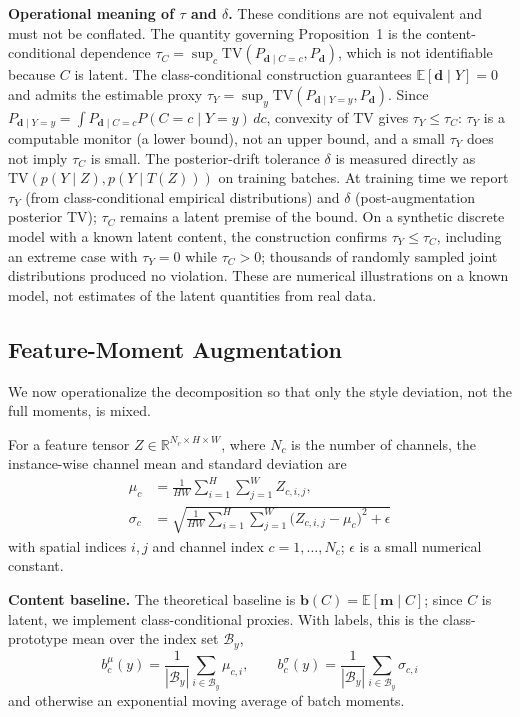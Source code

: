 \documentclass[electronics,article,submit,moreauthors]{Definitions/mdpi}
\newcommand{\add}[1]{\textcolor{addblue}{#1}}
\newcommand{\del}[1]{\textcolor{delred}{\st{#1}}}
\def\add#1{#1}%
\def\del#1{}%
\renewcommand{\add}[1]{#1}
\renewcommand{\del}[1]{}
\begin{document}
\add{\noindent\textbf{Operational meaning of $\tau$ and $\delta$.} These conditions are not equivalent and must not be conflated. The quantity governing Proposition~1 is the content-conditional dependence $\tau_C=\sup_c\mathrm{TV}(P_{\mathbf d\mid C=c},P_{\mathbf d})$, which is not identifiable because $C$ is latent. The class-conditional construction guarantees $\mathbb E[\mathbf d\mid Y]=0$ and admits the estimable proxy $\tau_Y=\sup_y\mathrm{TV}(P_{\mathbf d\mid Y=y},P_{\mathbf d})$. Since $P_{\mathbf d\mid Y=y}=\int P_{\mathbf d\mid C=c}P(C=c\mid Y=y)\,dc$, convexity of TV gives $\tau_Y\le\tau_C$: $\tau_Y$ is a computable monitor (a lower bound), not an upper bound, and a small $\tau_Y$ does not imply $\tau_C$ is small. The posterior-drift tolerance $\delta$ is measured directly as $\mathrm{TV}(p(Y\mid Z),p(Y\mid T(Z)))$ on training batches. At training time we report $\tau_Y$ (from class-conditional empirical distributions) and $\delta$ (post-augmentation posterior TV); $\tau_C$ remains a latent premise of the bound. On a synthetic discrete model with a known latent content, the construction confirms $\tau_Y\le\tau_C$, including an extreme case with $\tau_Y=0$ while $\tau_C>0$; thousands of randomly sampled joint distributions produced no violation. These are numerical illustrations on a known model, not estimates of the latent quantities from real data.}

\subsection{Feature-Moment Augmentation}
\label{sec:momentaug}

We now operationalize the decomposition so that only the style deviation, not the full moments, is mixed.

For a feature tensor $Z\in\mathbb{R}^{N_c\times H\times W}$, where $N_c$ is the number of channels, the instance-wise channel mean and standard deviation are
\begin{equation}
\begin{aligned}
\mu_c&=\frac{1}{HW}\sum_{i=1}^{H}\sum_{j=1}^{W} Z_{c,i,j},\\
\sigma_c&=\sqrt{\frac{1}{HW}\sum_{i=1}^{H}\sum_{j=1}^{W}\big(Z_{c,i,j}-\mu_c\big)^{2}+\epsilon}
\end{aligned}
\end{equation}
with spatial indices $i,j$ and channel index $c=1,\ldots,N_c$; $\epsilon$ is a small numerical constant.

\noindent\textbf{Content baseline.} \del{We estimate the baseline \mbox{$\mathbf{b}=(b^\mu,b^\sigma)$} by averaging moments over instances sharing content.}\add{The theoretical baseline is $\mathbf{b}(C)=\mathbb{E}[\mathbf{m}\mid C]$; since $C$ is latent, we implement class-conditional proxies.} With labels, this is the class-prototype mean over the index set $\mathcal{B}_y$,
\begin{equation}
b_c^\mu(y)=\frac{1}{|\mathcal{B}_y|}\sum_{i\in\mathcal{B}_y}\mu_{c,i},\qquad
b_c^\sigma(y)=\frac{1}{|\mathcal{B}_y|}\sum_{i\in\mathcal{B}_y}\sigma_{c,i}
\end{equation}
and otherwise an exponential moving average of batch moments.
\end{document}
